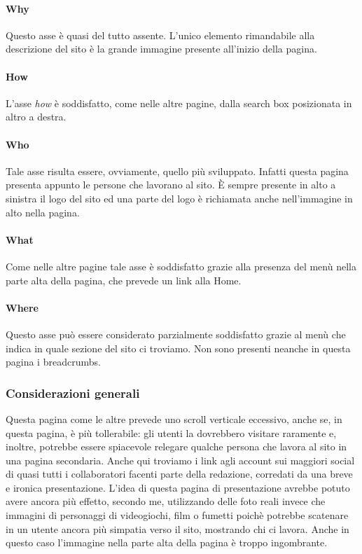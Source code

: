 \documentclass[../ProgettoTecWeb2.tex]{subfiles}
\begin{document}
			\paragraph{Why}
			Questo asse è quasi del tutto assente. L'unico elemento rimandabile alla descrizione del sito è la grande immagine presente all'inizio della pagina.

			\paragraph{How}
			L'asse \textit{how} è soddisfatto, come nelle altre pagine, dalla search box posizionata in altro a destra.
			
			\paragraph{Who}
			Tale asse risulta essere, ovviamente, quello più sviluppato. Infatti questa pagina presenta appunto le persone che lavorano al sito. È sempre presente in alto a sinistra il logo del sito ed una parte del logo è richiamata anche nell'immagine in alto nella pagina.

			\paragraph{What}
			Come nelle altre pagine tale asse è soddisfatto grazie alla presenza del menù nella parte alta della pagina, che prevede un link alla Home.

			\paragraph{Where}
			Questo asse può essere considerato parzialmente soddisfatto grazie al menù che indica in quale sezione del sito ci troviamo. Non sono presenti neanche in questa pagina i breadcrumbs.
		
		\subsubsection{Considerazioni generali}
		Questa pagina come le altre prevede uno scroll verticale eccessivo, anche se, in questa pagina, è più tollerabile: gli utenti la dovrebbero visitare raramente e, inoltre, potrebbe essere spiacevole relegare qualche persona che lavora al sito in una pagina secondaria. Anche qui troviamo i link agli account sui maggiori social di quasi tutti i collaboratori facenti parte della redazione, corredati da una breve e ironica presentazione. L'idea di questa pagina di presentazione avrebbe potuto avere ancora più effetto, secondo me, utilizzando delle foto reali invece che immagini di personaggi di videogiochi, film o fumetti poichè potrebbe scatenare in un utente ancora più simpatia verso il sito, mostrando chi ci lavora. Anche in questo caso l'immagine nella parte alta della pagina è troppo ingombrante.
\end{document}
